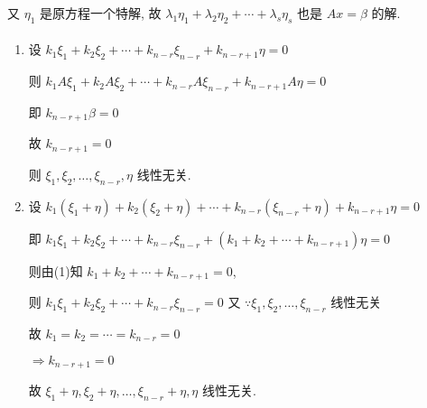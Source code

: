          又 \( \eta_{1} \) 是原方程一个特解, 故 \( \lambda_{1}\eta_{1} + \lambda_{2}\eta_{2} + \cdots + \lambda_{s}\eta_{s} \) 也是 \( Ax = \beta \) 的解.


     \paragraph{} %
         \begin{enumerate}
             \item %
                   设 \( k_{1}\xi_{1} + k_{2}\xi_{2} + \cdots + k_{n-r}\xi_{n-r} + k_{n-r+1}\eta = 0 \)

                   则 \( k_{1}A\xi_{1} + k_{2}A\xi_{2} + \cdots + k_{n-r}A\xi_{n-r} + k_{n-r+1}A\eta = 0 \)

                   即 \( k_{n-r+1}\beta = 0 \)

                   故 \( k_{n-r+1} = 0 \)

                   则 \( \xi_{1}, \xi_{2}, \dots, \xi_{n-r}, \eta \) 线性无关.
             \item %
                   设 \( k_{1}(\xi_{1}+\eta) + k_{2}(\xi_{2}+\eta) + \cdots + k_{n-r}(\xi_{n-r}+\eta) + k_{n-r+1}\eta = 0 \)

                   即 \( k_{1}\xi_{1} + k_{2}\xi_{2} + \cdots + k_{n-r}\xi_{n-r} + (k_{1}+k_{2}+\cdots+k_{n-r+1})\eta = 0 \)

                   则由(1)知 \( k_{1}+k_{2}+\cdots+k_{n-r+1} = 0 \),

                   则 \( k_{1}\xi_{1} + k_{2}\xi_{2} + \cdots + k_{n-r}\xi_{n-r} = 0 \)
                   又 \( \because \xi_{1}, \xi_{2}, \dots, \xi_{n-r} \) 线性无关

                   故 \( k_{1} = k_{2} = \cdots = k_{n-r} = 0 \)

                   \( \Rightarrow k_{n-r+1} = 0 \)

                   故 \( \xi_{1}+\eta, \xi_{2}+\eta, \dots, \xi_{n-r}+\eta, \eta \) 线性无关.
         \end{enumerate}


 \subsection{} %

